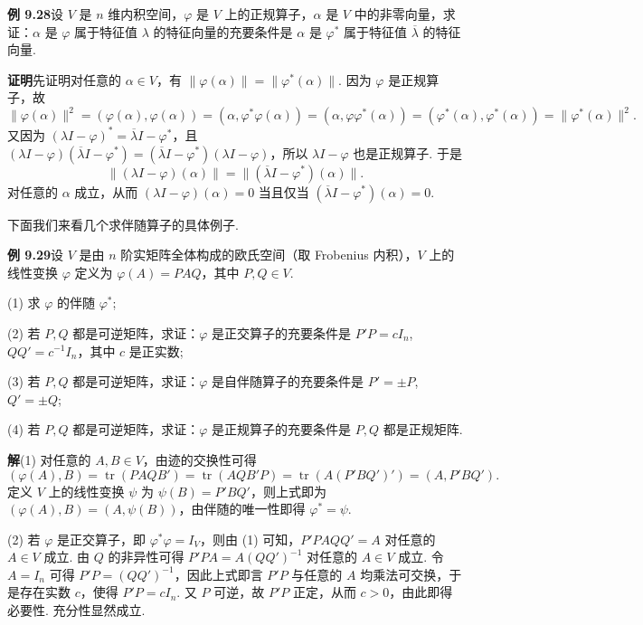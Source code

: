 \documentclass[UTF8,12pt,a4paper,fontset=fandol]{ctexart}
\begin{document}
\noindent\textbf{例 9.28}\quad 设 $V$ 是 $n$ 维内积空间，$\varphi$ 是 $V$ 上的正规算子，$\alpha$ 是 $V$ 中的非零向量，求证：$\alpha$ 是 $\varphi$ 属于特征值 $\lambda$ 的特征向量的充要条件是 $\alpha$ 是 $\varphi^*$ 属于特征值 $\overline{\lambda}$ 的特征向量.

\noindent\textbf{证明}\quad 先证明对任意的 $\alpha\in V$，有 $\|\varphi(\alpha)\|=\|\varphi^*(\alpha)\|$. 因为 $\varphi$ 是正规算子，故
\[
\|\varphi(\alpha)\|^2=(\varphi(\alpha),\varphi(\alpha))=(\alpha,\varphi^*\varphi(\alpha))
=(\alpha,\varphi\varphi^*(\alpha))=(\varphi^*(\alpha),\varphi^*(\alpha))=\|\varphi^*(\alpha)\|^2.
\]
又因为 $(\lambda I-\varphi)^*=\overline{\lambda}I-\varphi^*$，且 $(\lambda I-\varphi)(\overline{\lambda}I-\varphi^*)=(\overline{\lambda}I-\varphi^*)(\lambda I-\varphi)$，所以 $\lambda I-\varphi$ 也是正规算子. 于是
\[
\|(\lambda I-\varphi)(\alpha)\|=\|(\overline{\lambda}I-\varphi^*)(\alpha)\|.
\]
对任意的 $\alpha$ 成立，从而 $(\lambda I-\varphi)(\alpha)=0$ 当且仅当 $(\overline{\lambda}I-\varphi^*)(\alpha)=0$.

下面我们来看几个求伴随算子的具体例子.

\noindent\textbf{例 9.29}\quad 设 $V$ 是由 $n$ 阶实矩阵全体构成的欧氏空间（取 Frobenius 内积），$V$ 上的线性变换 $\varphi$ 定义为 $\varphi(A)=PAQ$，其中 $P,Q\in V$.

(1) 求 $\varphi$ 的伴随 $\varphi^*$;

(2) 若 $P,Q$ 都是可逆矩阵，求证：$\varphi$ 是正交算子的充要条件是 $P'P=cI_n$, $QQ'=c^{-1}I_n$，其中 $c$ 是正实数;

(3) 若 $P,Q$ 都是可逆矩阵，求证：$\varphi$ 是自伴随算子的充要条件是 $P'=\pm P$, $Q'=\pm Q$;

(4) 若 $P,Q$ 都是可逆矩阵，求证：$\varphi$ 是正规算子的充要条件是 $P,Q$ 都是正规矩阵.

\noindent\textbf{解}\quad (1) 对任意的 $A,B\in V$，由迹的交换性可得
\[
(\varphi(A),B)=\operatorname{tr}(PAQB')=\operatorname{tr}(AQB'P)
=\operatorname{tr}(A(P'BQ')')=(A,P'BQ').
\]
定义 $V$ 上的线性变换 $\psi$ 为 $\psi(B)=P'BQ'$，则上式即为 $(\varphi(A),B)=(A,\psi(B))$，由伴随的唯一性即得 $\varphi^*=\psi$.

(2) 若 $\varphi$ 是正交算子，即 $\varphi^*\varphi=I_V$，则由 (1) 可知，$P'PAQQ'=A$ 对任意的 $A\in V$ 成立. 由 $Q$ 的非异性可得 $P'PA=A(QQ')^{-1}$ 对任意的 $A\in V$ 成立. 令 $A=I_n$ 可得 $P'P=(QQ')^{-1}$，因此上式即言 $P'P$ 与任意的 $A$ 均乘法可交换，于是存在实数 $c$，使得 $P'P=cI_n$. 又 $P$ 可逆，故 $P'P$ 正定，从而 $c>0$，由此即得必要性. 充分性显然成立.
\end{document}
